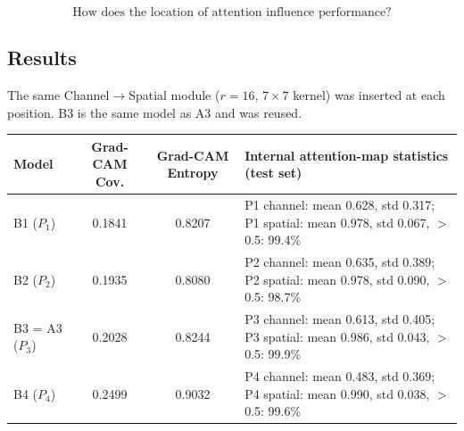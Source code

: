 \documentclass[10pt]{article}
\begin{document}
\[
\boxed{
\text{How does the location of attention influence performance?}
}
\]


\subsection*{Results}

The same Channel$\rightarrow$Spatial module ($r=16$, $7\times7$ kernel) was inserted at each position.
B3 is the same model as A3 and was reused.

\begin{center}
\end{center}

\begin{center}
\small
\begin{tabular}{|l|c|c|p{9.2cm}|}
\hline
\textbf{Model} & \textbf{Grad-CAM Cov.} & \textbf{Grad-CAM Entropy} & \textbf{Internal attention-map statistics (test set)} \\
\hline
B1 ($P_1$) & 0.1841 & 0.8207 & P1 channel: mean 0.628, std 0.317; P1 spatial: mean 0.978, std 0.067, $>$0.5: 99.4\% \\
\hline
B2 ($P_2$) & 0.1935 & 0.8080 & P2 channel: mean 0.635, std 0.389; P2 spatial: mean 0.978, std 0.090, $>$0.5: 98.7\% \\
\hline
B3 = A3 ($P_3$) & 0.2028 & 0.8244 & P3 channel: mean 0.613, std 0.405; P3 spatial: mean 0.986, std 0.043, $>$0.5: 99.9\% \\
\hline
B4 ($P_4$) & 0.2499 & 0.9032 & P4 channel: mean 0.483, std 0.369; P4 spatial: mean 0.990, std 0.038, $>$0.5: 99.6\% \\
\hline
\end{tabular}
\end{center}
\end{document}
